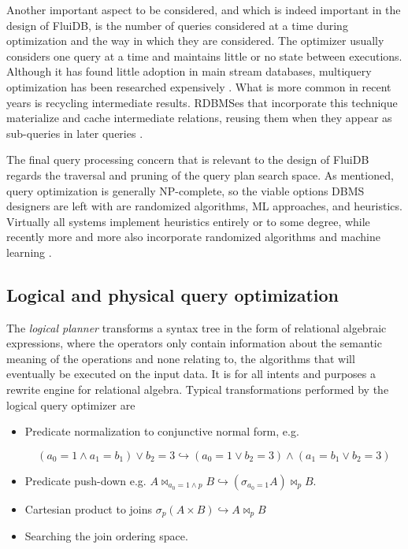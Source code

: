 Another important aspect to be considered, and which is indeed
important in the design of FluiDB, is the number of queries considered
at a time during optimization and the way in which they are
considered. The optimizer usually considers one query at a time and
maintains little or no state between executions. Although it has found
little adoption in main stream databases, multiquery optimization has
been researched expensively
\cite{michiardiCachebasedMultiqueryOptimization2021,wangMultiqueryOptimizationMapreduce2013,royEfficientExtensibleAlgorithms2000,rogersMultiqueryOptimization2017}. What
is more common in recent years is recycling intermediate
results. RDBMSes that incorporate this technique materialize and cache
intermediate relations, reusing them when they appear as sub-queries
in later queries
\cite{perezHistoryawareQueryOptimization2014,nagelRecyclingPipelinedQuery2013,ivanovaArchitectureRecyclingIntermediates2010}.

The final query processing concern that is relevant to the design of
FluiDB regards the traversal and pruning of the query plan search space. As
mentioned, query optimization is generally NP-complete, so the viable
options DBMS designers are left with are randomized algorithms, ML
approaches, and heuristics. Virtually all systems implement heuristics
entirely or to some degree, while recently more and more also
incorporate randomized algorithms
\cite{chandeGeneticOptimizationJoin2011} and machine learning
\cite{liMachineLearningDatabases2021,marcusNeoLearnedQuery2019}.

\subsection{Logical and physical query optimization}

The \emph{logical planner} transforms a syntax tree in the form of
relational algebraic expressions, where the operators only contain
information about the semantic meaning of the operations and none relating
to, the algorithms that will eventually be executed on the input
data. It is for all intents and purposes a rewrite engine for
relational algebra. Typical transformations performed by the logical
query optimizer are

\begin{itemize}
\item Predicate normalization to conjunctive normal form, e.g.

 \[(a_0 = 1
  \land a_1 = b_1) \lor b_2 = 3 \hookrightarrow (a_0 = 1 \lor b_2 = 3)
  \land (a_1 = b_1 \lor b_2 = 3)\]

\item Predicate push-down e.g. \(A \Join_{a_0 = 1 \land p} B
  \hookrightarrow (\sigma_{a_0 = 1} A) \Join_p B\).
\item Cartesian product to joins \(\sigma_p ( A \times B )
  \hookrightarrow A \Join_p B\)
\item Searching the join ordering space.
\end{itemize}

